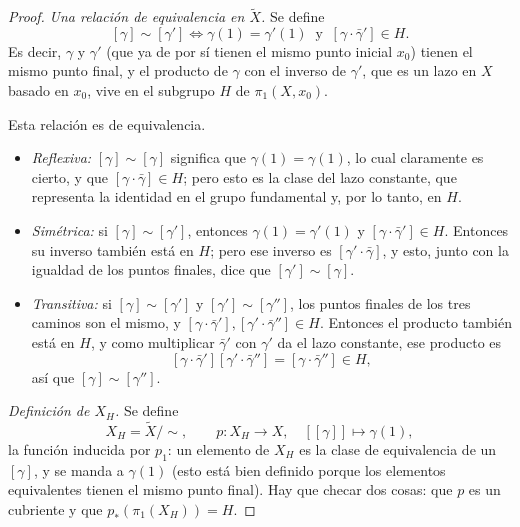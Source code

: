 \documentclass[11pt]{article}
\begin{document}
\begin{proof}
\emph{Una relación de equivalencia en $\tilde X$.} Se define
\[
  [\gamma]\sim[\gamma']\iff\gamma(1)=\gamma'(1)\ \text{ y }\ [\gamma\cdot\bar\gamma']\in H .
\]
Es decir, $\gamma$ y $\gamma'$ (que ya de por sí tienen el mismo punto inicial $x_0$) tienen el mismo punto final, y el producto de $\gamma$ con el inverso de $\gamma'$, que es un lazo en $X$ basado en $x_0$, vive en el subgrupo $H$ de $\pi_1(X,x_0)$.

\begin{center}
\end{center}

Esta relación es de equivalencia.
\begin{itemize}
  \item \emph{Reflexiva:} $[\gamma]\sim[\gamma]$ significa que $\gamma(1)=\gamma(1)$, lo cual claramente es cierto, y que $[\gamma\cdot\bar\gamma]\in H$; pero esto es la clase del lazo constante, que representa la identidad en el grupo fundamental y, por lo tanto, en $H$.
  \item \emph{Simétrica:} si $[\gamma]\sim[\gamma']$, entonces $\gamma(1)=\gamma'(1)$ y $[\gamma\cdot\bar\gamma']\in H$. Entonces su inverso también está en $H$; pero ese inverso es $[\gamma'\cdot\bar\gamma]$, y esto, junto con la igualdad de los puntos finales, dice que $[\gamma']\sim[\gamma]$.
  \item \emph{Transitiva:} si $[\gamma]\sim[\gamma']$ y $[\gamma']\sim[\gamma'']$, los puntos finales de los tres caminos son el mismo, y $[\gamma\cdot\bar\gamma'],[\gamma'\cdot\bar\gamma'']\in H$. Entonces el producto también está en $H$, y como multiplicar $\bar\gamma'$ con $\gamma'$ da el lazo constante, ese producto es
  \[
    [\gamma\cdot\bar\gamma'][\gamma'\cdot\bar\gamma'']=[\gamma\cdot\bar\gamma'']\in H ,
  \]
  así que $[\gamma]\sim[\gamma'']$.
\end{itemize}

\medskip\noindent\emph{Definición de $X_H$.} Se define
\[
  X_H=\tilde X/\!\sim ,\qquad p\colon X_H\to X,\quad [[\gamma]]\longmapsto\gamma(1),
\]
la función inducida por $p_1$: un elemento de $X_H$ es la clase de equivalencia de un $[\gamma]$, y se manda a $\gamma(1)$ (esto está bien definido porque los elementos equivalentes tienen el mismo punto final). Hay que checar dos cosas: que $p$ es un cubriente y que $p_*(\pi_1(X_H))=H$.


\end{proof}
\end{document}
